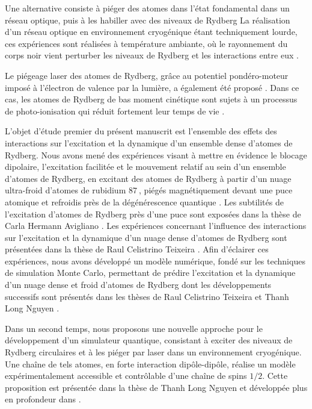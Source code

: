 Une alternative consiste à piéger des atomes dans l'état fondamental dans un réseau optique, puis à les habiller avec des niveaux de Rydberg \cite{Johnson2010,Zeiher2016,Bijnen2015,Glaetzle2015,Macri2014}
La réalisation d'un réseau optique en environnement cryogénique étant techniquement lourde, ces expériences sont réalisées à température ambiante, où le rayonnement du corps noir vient perturber les niveaux de Rydberg et les interactions entre eux \cite{MX_PORTORYDDRESS16,Zeiher2016}.

Le piégeage laser des atomes de Rydberg, grâce au potentiel pondéro-moteur imposé à l'électron de valence par la lumière, a également été proposé \cite{MX_RAITHELTRAP00}.
Dans ce cas, les atomes de Rydberg de bas moment cinétique sont sujets à un processus de photo-ionisation qui réduit fortement leur temps de vie \cite{MX_RAITHELPHOTION13}.

\bigskip
L'objet d'étude premier du présent manuscrit est l'ensemble des effets des interactions sur l'excitation et la dynamique d'un ensemble dense d'atomes de Rydberg.
Nous avons mené des expériences visant à mettre en évidence le blocage dipolaire, l'excitation facilitée et le mouvement relatif au sein d'un ensemble d'atomes de Rydberg, en excitant des atomes de Rydberg à partir d'un nuage ultra-froid d'atomes de rubidium $\SI{87}{}$, piégés magnétiquement devant une puce atomique et refroidis près de la dégénérescence quantique \cite{ENS_CHIPSPECTRO14,ENS_CHIPINTERACTION15}.
Les subtilités de l'excitation d'atomes de Rydberg près d'une puce sont exposées dans la thèse de Carla Hermann Avigliano \cite{PHD_HERMANN}.
Les expériences concernant l'influence des interactions sur l'excitation et la dynamique d'un nuage dense d'atomes de Rydberg sont présentées dans la thèse de Raul Celistrino Teixeira \cite{PHD_CELISTRINO}.
Afin d'éclairer ces expériences, nous avons développé un modèle numérique, fondé sur les techniques de simulation Monte Carlo, permettant de prédire l'excitation et la dynamique d'un nuage dense et froid d'atomes de Rydberg dont les développements successifs sont présentés dans les thèses de Raul Celistrino Teixeira \cite{PHD_CELISTRINO} et Thanh Long Nguyen \cite{PHD_NGUYEN}.

\bigskip
Dans un second temps, nous proposons une nouvelle approche pour le développement d'un simulateur quantique, consistant à exciter des niveaux de Rydberg circulaires et à les piéger par laser dans un environnement cryogénique.
Une chaîne de tels atomes, en forte interaction dipôle-dipôle,  réalise un modèle expérimentalement accessible et contrôlable d'une chaîne de spins $1/2$.
Cette proposition est présentée dans la thèse de Thanh Long Nguyen \cite{PHD_NGUYEN} et développée plus en profondeur dans \cite{ENS_PRE_CIRCSIM}.

